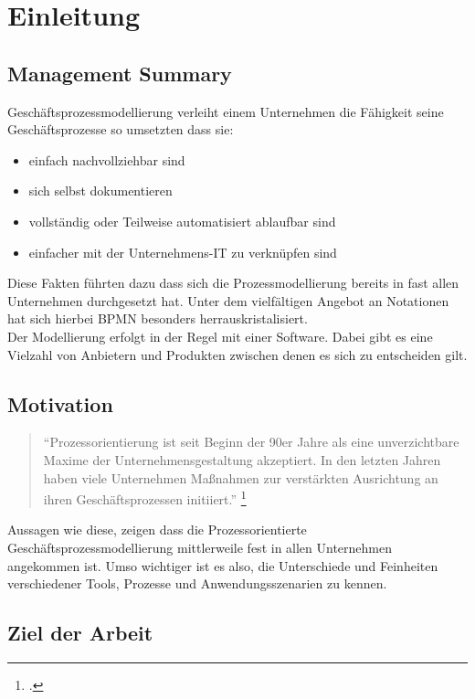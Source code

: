\section{Einleitung}


\subsection{Management Summary}


Geschäftsprozessmodellierung verleiht einem Unternehmen die Fähigkeit seine
Geschäftsprozesse so umsetzten dass sie:

\begin{itemize}
\item einfach nachvollziehbar sind
\item sich selbst dokumentieren
\item vollständig oder Teilweise automatisiert ablaufbar sind
\item einfacher mit der Unternehmens-IT zu verknüpfen sind
\end{itemize}

Diese Fakten führten dazu dass sich die Prozessmodellierung bereits in fast
allen Unternehmen durchgesetzt hat.
Unter dem vielfältigen Angebot an Notationen hat sich hierbei BPMN besonders
herrauskristalisiert.\\

Der Modellierung erfolgt in der Regel mit einer Software. Dabei gibt es eine
Vielzahl von Anbietern und Produkten zwischen denen es sich zu entscheiden gilt.


\subsection{Motivation}

\begin{quote}
"`Prozessorientierung ist seit Beginn der 90er Jahre als eine unverzichtbare
Maxime der Unternehmensgestaltung akzeptiert. In den letzten Jahren
haben viele Unternehmen Maßnahmen
 zur verstärkten Ausrichtung an ihren Geschäftsprozessen initiiert."'
\footcite[S.182]{prozessmanagement:leitfaden}
\end{quote}


Aussagen wie diese, zeigen dass die Prozessorientierte
Geschäftsprozessmodellierung mittlerweile fest in allen Unternehmen angekommen
ist.
Umso wichtiger ist es also, die Unterschiede und Feinheiten verschiedener Tools,
Prozesse und Anwendungsszenarien zu kennen.

\subsection{Ziel der Arbeit}

